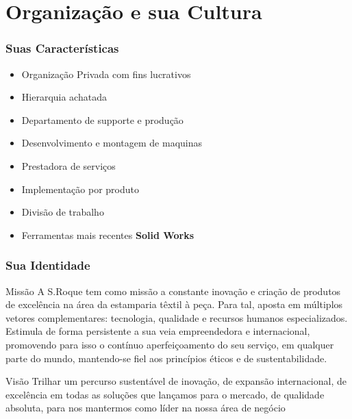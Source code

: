 \section{Organização e sua Cultura}
\begin{frame}
\frametitle{Suas Características}
\begin{itemize}
\item Organização Privada com fins lucrativos
\item Hierarquia achatada
\item Departamento de supporte e produção
\item Desenvolvimento e montagem de maquinas
\item Prestadora de serviços
\item Implementação por produto
\item Divisão de trabalho
\item Ferramentas mais recentes \textbf{Solid Works}
\end{itemize}
\end{frame}
\begin{frame}
\frametitle{Sua Identidade}
\begin{block}{Missão}
A S.Roque tem como missão a constante inovação e criação de produtos de excelência na área da estamparia têxtil à peça. Para tal, aposta em múltiplos vetores complementares: tecnologia, qualidade e recursos humanos especializados. Estimula de forma persistente a sua veia empreendedora e internacional, promovendo para isso o contínuo aperfeiçoamento do seu serviço, em qualquer parte do mundo, mantendo-se fiel aos princípios éticos e de sustentabilidade.
\end{block}
\begin{alertblock}{Visão}
Trilhar um percurso sustentável de inovação, de expansão internacional, de excelência em todas as soluções que lançamos para o mercado, de qualidade absoluta, para nos mantermos como líder na nossa área de negócio
\end{alertblock}
\end{frame}
